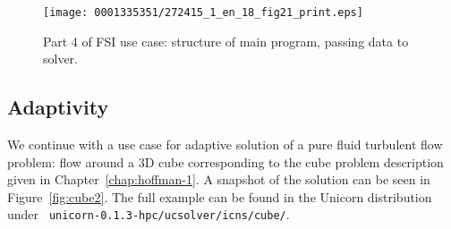 \begin{figure}[!p]
\bwfig
\texttt{[image: 0001335351/272415\_1\_en\_18\_fig21\_print.eps]}
\caption{Part 4 of FSI use case: structure of main program, passing data to solver.}
\label{code:UseCasePart4}\vspace*{2pc}
\end{figure}



\vspace*{4pt}
\subsection{Adaptivity}

We continue with a use case for adaptive solution of a pure fluid
turbulent flow problem: flow around a 3D cube corresponding to the
cube problem description given in Chapter~\ref{chap:hoffman-1}. A
snapshot of the solution can be seen in Figure~\ref{fig:cube2}. The
full example can be found in the Unicorn distribution under {\tt
unicorn-0.1.3-hpc/ucsolver/icns/cube/}.


